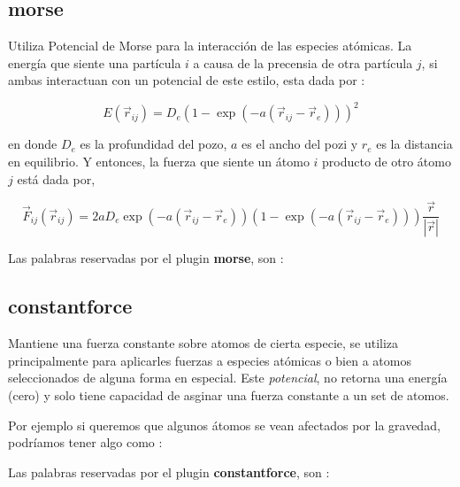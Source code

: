 \subsection{morse}
Utiliza Potencial de Morse para la interacci\'on de las especies at\'omicas. La energ\'ia que siente una part\'icula $i$ a causa de la precensia de otra part\'icula $j$, si ambas interactuan con un potencial de este estilo, esta dada por :

$$E(\vec{r}_{ij}) = D_e\left(1-\exp(-a(\vec{r}_{ij}-\vec{r}_e))\right)^2$$

en donde $D_e$ es la profundidad del pozo, $a$ es el ancho del pozi y $r_e$ es la distancia en equilibrio. Y entonces, la fuerza que siente un \'atomo $i$ producto de otro \'atomo $j$ est\'a dada por,

$$\vec{F}_{ij} ( \vec{r}_{ij}) = 2aD_e\exp(-a(\vec{r}_{ij}-\vec{r}_e))\left(1-\exp(-a(\vec{r}_{ij}-\vec{r}_e))\right)\frac{\vec{r}}{|\vec{r}|}$$

Las palabras reservadas por el plugin \textbf{morse}, son :


\subsection{constantforce}
Mantiene una fuerza constante sobre atomos de cierta especie, se utiliza principalmente para aplicarles fuerzas a especies at\'omicas o bien a atomos seleccionados de alguna forma en especial. Este \textit{potencial}, no retorna una energ\'ia (cero) y solo tiene capacidad de asginar una fuerza constante a un set de atomos.

Por ejemplo si queremos que algunos \'atomos se vean afectados por la gravedad, podr\'iamos tener algo como :


Las palabras reservadas por el plugin \textbf{constantforce}, son :


